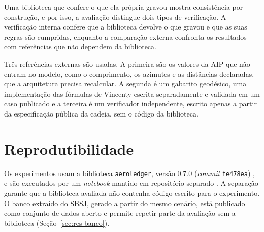 Uma biblioteca que confere o que ela própria gravou mostra consistência por construção, e por isso, a avaliação distingue dois tipos de verificação. A verificação interna confere que a biblioteca devolve o que gravou e que as suas regras são cumpridas, enquanto a comparação externa confronta os resultados com referências que não dependem da biblioteca.

Três referências externas são usadas. A primeira são os valores da AIP que não entram no modelo, como o comprimento, os azimutes e as distâncias declaradas, que a arquitetura precisa recalcular. A segunda é um gabarito geodésico, uma implementação das fórmulas de Vincenty escrita separadamente e validada em um caso publicado e a terceira é um verificador independente, escrito apenas a partir da especificação pública da cadeia, sem o código da biblioteca.

\section{Reprodutibilidade}\label{sec:reprodutibilidade}

Os experimentos usam a biblioteca \texttt{aeroledger}, versão 0.7.0 (\textit{commit} \texttt{fe478ea}) \cite{aeroledger}, e são executados por um \textit{notebook} mantido em repositório separado \cite{aeroledger_experimentos}. A separação garante que a biblioteca avaliada não contenha código escrito para o experimento. O banco extraído do SBSJ, gerado a partir do mesmo cenário, está publicado como conjunto de dados aberto \cite{aeroledger_dataset} e permite repetir parte da avaliação sem a biblioteca (Seção~\ref{sec:res-banco}).
